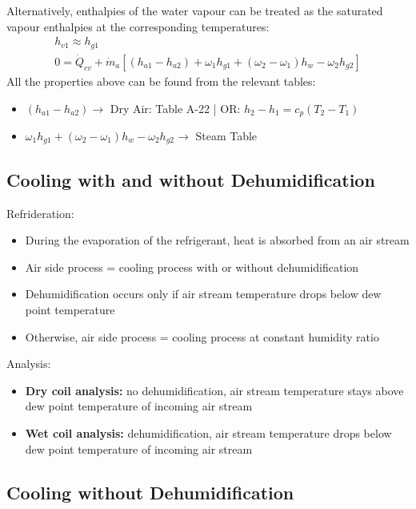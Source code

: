\documentclass[class=report, crop=false, 12pt,a4paper]{standalone}
\numberwithin{equation}{section}
\begin{document}
Alternatively, enthalpies of the water vapour can be treated as the saturated vapour enthalpies at the corresponding temperatures:
\begin{gather}
  h_{v1} \approx h_{g1} \\[5pt]
  0 = \dot{Q}_{cv} + \dot{m}_{a}\left[(h_{a1} - h_{a2}) + \omega_1h_{g1} + (\omega_2-\omega_1)h_{w} - \omega_2h_{g2}\right] 
\end{gather}
All the properties above can be found from the relevant tables:
\begin{itemize}
  \item $(h_{a1} - h_{a2}) \longrightarrow$ Dry Air: Table A-22 | OR: $h_2-h_1 = c_p(T_2-T_1)$
  \item $\omega_1h_{g1} + (\omega_2-\omega_1)h_{w} - \omega_2h_{g2} \longrightarrow$ Steam Table
\end{itemize}
\subsection{Cooling with and without Dehumidification}
Refrideration:
\begin{itemize}[noitemsep]
  \item During the evaporation of the refrigerant, heat is absorbed from an air stream
  \item Air side process = cooling process with or without dehumidification
  \item Dehumidification occurs only if air stream temperature drops below dew point temperature
  \item Otherwise, air side process = cooling process at constant humidity ratio
\end{itemize}
Analysis:
\begin{itemize}[noitemsep]
  \item \textbf{Dry coil analysis:} no dehumidification, air stream temperature stays above dew point temperature of incoming air stream
  \item \textbf{Wet coil analysis:} dehumidification, air stream temperature drops below dew point temperature of incoming air stream
\end{itemize}
\newpage
\subsection*{Cooling without Dehumidification}
\end{document}
